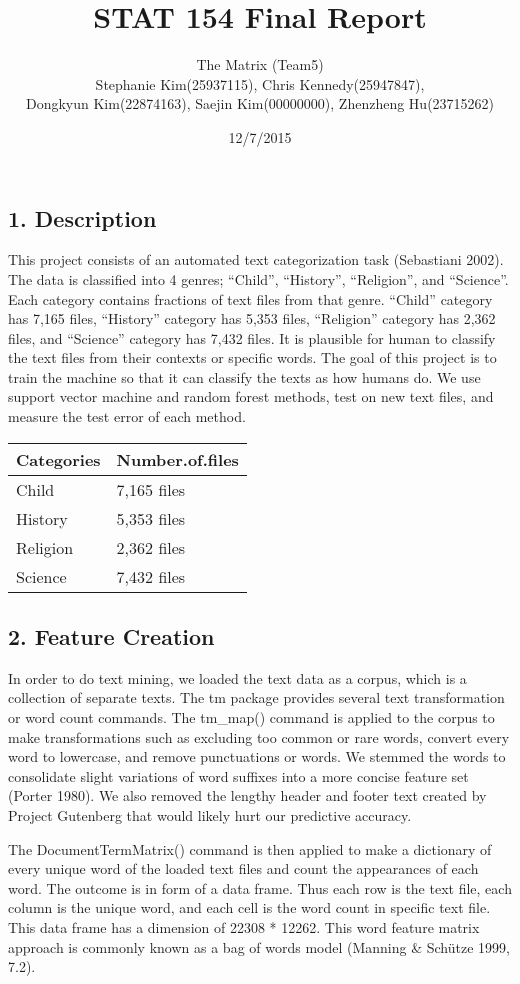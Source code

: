 \documentclass[12pt,]{article}
\title{STAT 154 Final Report}
\author{The Matrix (Team5)\\Stephanie Kim(25937115), Chris
Kennedy(25947847),\\Dongkyun Kim(22874163), Saejin Kim(00000000),
Zhenzheng Hu(23715262)}
\date{12/7/2015}
\begin{document}
\maketitle


{
\hypersetup{linkcolor=black}
\setcounter{tocdepth}{2}
\tableofcontents
}
\subsection{{1. Description}}\label{description}

This project consists of an automated text categorization task
(Sebastiani 2002). The data is classified into 4 genres; ``Child'',
``History'', ``Religion'', and ``Science''. Each category contains
fractions of text files from that genre. ``Child'' category has 7,165
files, ``History'' category has 5,353 files, ``Religion'' category has
2,362 files, and ``Science'' category has 7,432 files. It is plausible
for human to classify the text files from their contexts or specific
words. The goal of this project is to train the machine so that it can
classify the texts as how humans do. We use support vector machine and
random forest methods, test on new text files, and measure the test
error of each method.

\begin{longtable}[c]{@{}ll@{}}
\toprule
Categories & Number.of.files\tabularnewline
\midrule
\endhead
Child & 7,165 files\tabularnewline
History & 5,353 files\tabularnewline
Religion & 2,362 files\tabularnewline
Science & 7,432 files\tabularnewline
\bottomrule
\end{longtable}

\subsection{{2. Feature Creation}}\label{feature-creation}

In order to do text mining, we loaded the text data as a corpus, which
is a collection of separate texts. The tm package provides several text
transformation or word count commands. The tm\_map() command is applied
to the corpus to make transformations such as excluding too common or
rare words, convert every word to lowercase, and remove punctuations or
words. We stemmed the words to consolidate slight variations of word
suffixes into a more concise feature set (Porter 1980). We also removed
the lengthy header and footer text created by Project Gutenberg that
would likely hurt our predictive accuracy.

The DocumentTermMatrix() command is then applied to make a dictionary of
every unique word of the loaded text files and count the appearances of
each word. The outcome is in form of a data frame. Thus each row is the
text file, each column is the unique word, and each cell is the word
count in specific text file. This data frame has a dimension of 22308 *
12262. This word feature matrix approach is commonly known as a bag of
words model (Manning \& Schütze 1999, 7.2).
\end{document}
